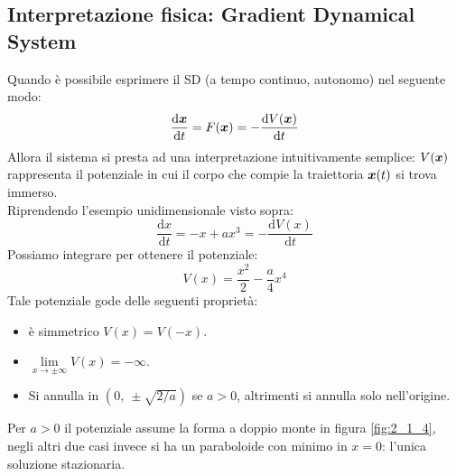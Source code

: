 \subsection{Interpretazione fisica: Gradient Dynamical System}%
\label{sub:Interpretazione fisica: Gradient Dynamical System}
Quando è possibile esprimere il SD (a tempo continuo, autonomo) nel seguente modo:
\[
    \frac{\text{d} \boldsymbol{x}}{\text{d} t} = F(\boldsymbol{x}) = - \frac{\text{d} V(\boldsymbol{x})}{\text{d} t} 
\] 
Allora il sistema si presta ad una interpretazione intuitivamente semplice: $V(\boldsymbol{x})$  rappresenta il potenziale in cui il corpo che compie la traiettoria $\boldsymbol{x} (t)$ si trova immerso.\\
Riprendendo l'esempio unidimensionale visto sopra:
\[
    \frac{\text{d} x}{\text{d} t} = - x + a x^3 = - \frac{\text{d} V(x)}{\text{d} t} 
\] 
Possiamo integrare per ottenere il potenziale:
\[
    V(x)=\frac{x^2}{2}-\frac{a}{4}x^4
\] 
Tale potenziale gode delle seguenti proprietà:
\begin{itemize}
    \item è simmetrico $V(x)=V(-x)$.
    \item $\lim\limits_{x \to \pm\infty} V(x)=-\infty$.
    \item Si annulla in $(0, \ \pm \sqrt{2 / a})$ se $a>0$, altrimenti si annulla solo nell'origine.
\end{itemize}
Per $a>0$ il potenziale assume la forma a doppio monte in figura \ref{fig:2_1_4}, negli altri due casi invece si ha un paraboloide con minimo in $x=0$: l'unica soluzione stazionaria.
